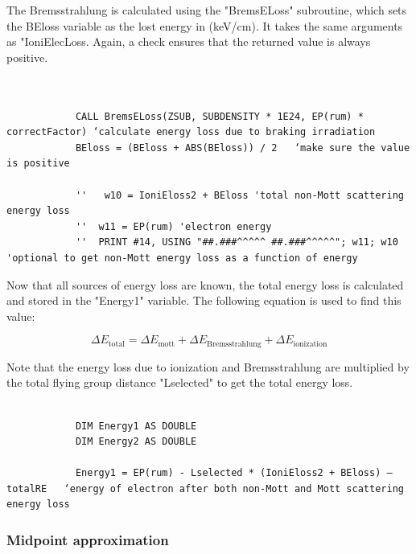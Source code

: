 \documentclass[10pt, reqno]{exam}
\begin{document}
The Bremsstrahlung is calculated using the "BremsELoss" subroutine, which sets the BEloss variable as the lost energy in (\si{keV/cm}). It takes the same arguments as "IoniElecLoss. Again, a check ensures that the returned value is always positive. \par

\begin{verbatim}

    
            CALL BremsELoss(ZSUB, SUBDENSITY * 1E24, EP(rum) * correctFactor) ‘calculate energy loss due to braking irradiation 
            BEloss = (BEloss + ABS(BEloss)) / 2   ‘make sure the value is positive
    
            ''   w10 = IoniEloss2 + BEloss 'total non-Mott scattering energy loss
            ''  w11 = EP(rum) 'electron energy 
            ''  PRINT #14, USING "##.###^^^^^ ##.###^^^^^"; w11; w10 'optional to get non-Mott energy loss as a function of energy
\end{verbatim}

Now that all sources of energy loss are known, the total energy loss is calculated and stored in the "Energy1" variable. The following equation is used to find this value: \par

\begin{equation}
    \Delta E_{\text{total}} = \Delta E_{\text{mott}} + \Delta E_{\text{Bremsstrahlung}} + \Delta E_{\text{ionization}}
\end{equation}

Note that the energy loss due to ionization and Bremsstrahlung are multiplied by the total flying group distance "Lselected" to get the total energy loss. \par

\begin{verbatim}

            DIM Energy1 AS DOUBLE
            DIM Energy2 AS DOUBLE
    
            Energy1 = EP(rum) - Lselected * (IoniEloss2 + BEloss) – totalRE   ‘energy of electron after both non-Mott and Mott scattering energy loss
\end{verbatim}

\subsubsection{Midpoint approximation}
\end{document}
